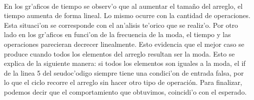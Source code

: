 \paragraph{}
En los gr'aficos de tiempo se observ'o que al aumentar el tama\~{n}o del arreglo, el tiempo 
aumenta de forma lineal. Lo mismo ocurre con la cantidad de operaciones. Esta situaci'on se 
corresponde con el an'alisis te'orico que se realiz'o. Por otro lado en los gr'aficos en funci'on 
de la frecuencia de la moda, el tiempo y las operaciones parecieran decrecer linealmente. Esto 
evidencia que el mejor caso se produce cuando todos los elementos del arreglo resultan ser la moda. Esto se
explica de la siguiente manera: si todos los elementos son iguales a la moda, el if de la linea 5 del seudoc'odigo
siempre tiene una condici'on de entrada falsa, por lo que el ciclo recorre el arreglo sin hacer otro tipo de operación.
Para finalizar, podemos decir que el comportamiento que obtuvimos, coincidi'o con el esperado.
